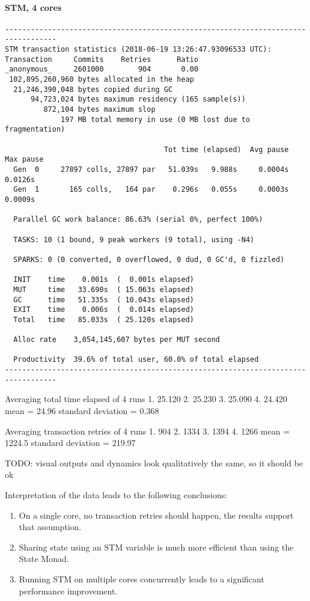 \paragraph{STM, 4 cores}
\begin{verbatim}
----------------------------------------------------------------------------------
STM transaction statistics (2018-06-19 13:26:47.93096533 UTC):
Transaction     Commits    Retries      Ratio
_anonymous_     2601000        904       0.00
 102,895,260,960 bytes allocated in the heap
  21,246,390,048 bytes copied during GC
      94,723,024 bytes maximum residency (165 sample(s))
         872,104 bytes maximum slop
             197 MB total memory in use (0 MB lost due to fragmentation)

                                     Tot time (elapsed)  Avg pause  Max pause
  Gen  0     27897 colls, 27897 par   51.039s   9.988s     0.0004s    0.0126s
  Gen  1       165 colls,   164 par    0.296s   0.055s     0.0003s    0.0009s

  Parallel GC work balance: 86.63% (serial 0%, perfect 100%)

  TASKS: 10 (1 bound, 9 peak workers (9 total), using -N4)

  SPARKS: 0 (0 converted, 0 overflowed, 0 dud, 0 GC'd, 0 fizzled)

  INIT    time    0.001s  (  0.001s elapsed)
  MUT     time   33.690s  ( 15.063s elapsed)
  GC      time   51.335s  ( 10.043s elapsed)
  EXIT    time    0.006s  (  0.014s elapsed)
  Total   time   85.033s  ( 25.120s elapsed)

  Alloc rate    3,054,145,607 bytes per MUT second

  Productivity  39.6% of total user, 60.0% of total elapsed
----------------------------------------------------------------------------------
\end{verbatim}
  
Averaging total time elapsed of 4 runs 
1. 25.120
2. 25.230
3. 25.090
4. 24.420
mean = 24.96
standard deviation = 0.368

Averaging transaction retries of 4 runs
1. 904
2. 1334
3. 1394
4. 1266
mean = 1224.5
standard deviation = 219.97

TODO: visual outputs and dynamics look qualitatively the same, so it should be ok

Interpretation of the data leads to the following conclusions:
\begin{enumerate}
	\item On a single core, no transaction retries should happen, the results support that assumption.
	\item Sharing state using an STM variable is much more efficient than using the State Monad.
	\item Running STM on multiple cores concurrently leads to a significant performance improvement.
\end{enumerate}


